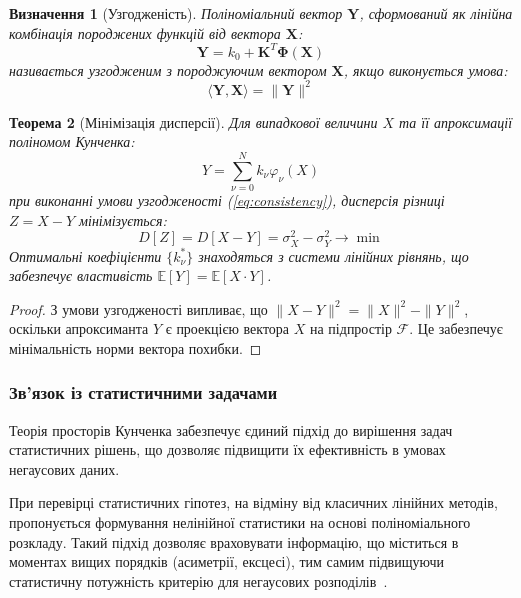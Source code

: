 \documentclass[12pt,a4paper]{article}
\newtheorem{theorem}{Теорема}[section]
\newtheorem{definition}[theorem]{Визначення}
\begin{document}
\begin{definition}[Узгодженість]
	Поліноміальний вектор $\mathbf{Y}$, сформований як лінійна комбінація породжених функцій від вектора $\mathbf{X}$:
	\begin{equation}
		\mathbf{Y} = k_0 + \mathbf{K}^T \boldsymbol{\Phi}(\mathbf{X})
	\end{equation}
	називається узгодженим з породжуючим вектором $\mathbf{X}$, якщо виконується умова:
	\begin{equation}
		\langle \mathbf{Y}, \mathbf{X} \rangle = \|\mathbf{Y}\|^2
		\label{eq:consistency}
	\end{equation}
\end{definition}

\begin{theorem}[Мінімізація дисперсії]
	\label{thm:variance_minimization}
	Для випадкової величини $X$ та її апроксимації поліномом Кунченка:
	\begin{equation}
		Y = \sum_{\nu=0}^N k_\nu \varphi_\nu(X)
	\end{equation}
	при виконанні умови узгодженості (\ref{eq:consistency}), дисперсія різниці $Z = X - Y$ мінімізується:
	\begin{equation}
		D[Z] = D[X - Y] = \sigma_X^2 - \sigma_Y^2 \to \min
	\end{equation}
	Оптимальні коефіцієнти $\{k_\nu^*\}$ знаходяться з системи лінійних рівнянь, що забезпечує властивість $\mathbb{E}[Y] = \mathbb{E}[X \cdot Y]$.
\end{theorem}

\begin{proof}
	З умови узгодженості випливає, що $\|X - Y\|^2 = \|X\|^2 - \|Y\|^2$, оскільки апроксиманта $Y$ є проекцією вектора $X$ на підпростір $\mathcal{F}$. Це забезпечує мінімальність норми вектора похибки.
\end{proof}

\subsubsection{Зв'язок із статистичними задачами}
\label{sec:kunchenko_connection}

Теорія просторів Кунченка забезпечує єдиний підхід до вирішення задач статистичних рішень, що дозволяє підвищити їх ефективність в умовах негаусових даних.

При перевірці статистичних гіпотез, на відміну від класичних лінійних методів, пропонується формування нелінійної статистики на основі поліноміального розкладу. Такий підхід дозволяє враховувати інформацію, що міститься в моментах вищих порядків (асиметрії, ексцесі), тим самим підвищуючи статистичну потужність критерію для негаусових розподілів~\cite{zabolotnii2018method}.
\end{document}
